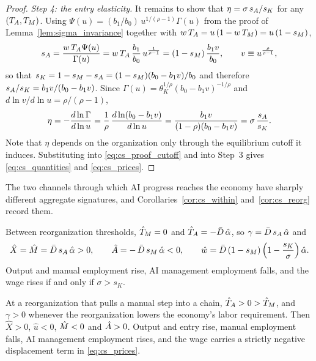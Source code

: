 \begin{proof}
\emph{Step 4: the entry elasticity.}
It remains to show that $\eta = \sigma\,s_{A}/s_{K}$ for any $(T_{A}, T_{M})$.
Using $\Psi(u) = (b_1/b_0)\,u^{1/(\rho-1)}\Gamma(u)$ from the proof of Lemma~\ref{lem:sigma_invariance} together with $w\,T_{A} = u\,(1 - w\,T_{M}) = u\,(1-s_{M})$,
\[
s_{A} = \frac{w\,T_{A}\Psi(u)}{\Gamma(u)} = w\,T_{A}\,\frac{b_1}{b_0}\,u^{\frac{1}{\rho-1}} = (1-s_{M})\,\frac{b_1 v}{b_0},
\qquad v \equiv u^{\frac{\rho}{\rho-1}},
\]
so that $s_{K} = 1 - s_{M} - s_{A} = (1-s_{M})(b_0 - b_1 v)/b_0$ and therefore $s_{A}/s_{K} = b_1 v/(b_0 - b_1 v)$.
Since $\Gamma(u) = \theta_{K}^{1/\rho}(b_0 - b_1 v)^{-1/\rho}$ and $d\ln v/d\ln u = \rho/(\rho-1)$,
\[
\eta = -\frac{d \ln \Gamma}{d \ln u} = \frac{1}{\rho}\,\frac{d \ln (b_0 - b_1 v)}{d \ln u} = \frac{b_1 v}{(1-\rho)(b_0 - b_1 v)} = \sigma\,\frac{s_{A}}{s_{K}}.
\]
Note that $\eta$ depends on the organization only through the equilibrium cutoff it induces.
Substituting into \eqref{eq:cs_proof_cutoff} and into Step~3 gives \eqref{eq:cs_quantities} and \eqref{eq:cs_prices}.
\end{proof}

The two channels through which AI progress reaches the economy have sharply different aggregate signatures, and Corollaries~\ref{cor:cs_within} and~\ref{cor:cs_reorg} record them.

\begin{cor}
\label{cor:cs_within}
Between reorganization thresholds, $\hat{T}_{M} = 0$ and $\hat{T}_{A} = -\bar{D}\,\hat{\alpha}$, so $\gamma = \bar{D}\,s_{A}\,\hat{\alpha}$ and
\[
\hat{X} = \hat{M} = \bar{D}\,s_{A}\,\hat{\alpha} > 0,
\qquad
\hat{A} = -\,\bar{D}\,s_{M}\,\hat{\alpha} < 0,
\qquad
\hat{w} = \bar{D}\left(1 - s_{M}\right)\left(1 - \frac{s_{K}}{\sigma}\right)\hat{\alpha}.
\]
Output and manual employment rise, AI management employment falls, and the wage rises if and only if $\sigma > s_{K}$.
\end{cor}

\begin{cor}
\label{cor:cs_reorg}
At a reorganization that pulls a manual step into a chain, $\hat{T}_{A} > 0 > \hat{T}_{M}$, and $\gamma > 0$ whenever the reorganization lowers the economy's labor requirement.
Then $\hat{X} > 0$, $\hat{u} < 0$, $\hat{M} < 0$ and $\hat{A} > 0$.
Output and entry rise, manual employment falls, AI management employment rises, and the wage carries a strictly negative displacement term in \eqref{eq:cs_prices}.
\end{cor}

